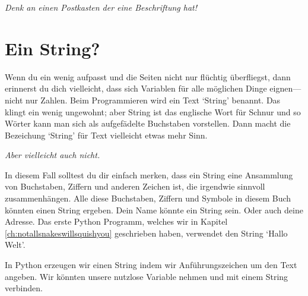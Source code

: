 \noindent
\emph{Denk an einen Postkasten der eine Beschriftung hat!}

\section{Ein String?}

Wenn du ein wenig aufpasst und die Seiten nicht nur flüchtig überfliegst, dann erinnerst du dich vielleicht, dass sich Variablen für alle möglichen Dinge eignen---nicht nur Zahlen. Beim Programmieren wird ein Text `String' benannt. Das klingt ein wenig ungewohnt; aber String ist das englische Wort für Schnur und so Wörter kann man sich als aufgefädelte Buchstaben vorstellen. Dann macht die Bezeichung `String' für Text vielleicht etwas mehr Sinn.

\noindent
\emph{Aber vielleicht auch nicht.}

In diesem Fall solltest du dir einfach merken, dass ein String eine Ansammlung von Buchstaben, Ziffern und anderen Zeichen ist, die irgendwie sinnvoll zusammenhängen. Alle diese Buchstaben, Ziffern und Symbole in diesem Buch könnten einen String ergeben. Dein Name könnte ein String sein. Oder auch deine Adresse. Das erste Python Programm, welches wir in Kapitel \ref{ch:notallsnakeswillsquishyou} geschrieben haben, verwendet den String `Hallo Welt'.

\par
In Python erzeugen wir einen String indem wir Anführungszeichen um den Text angeben. Wir könnten unsere nutzlose  Variable nehmen und mit einem String verbinden.

